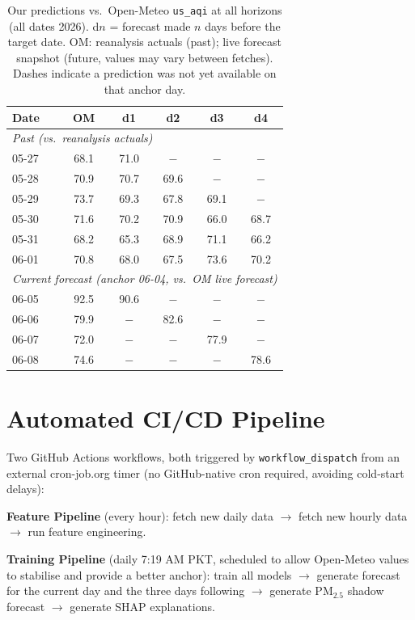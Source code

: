 \documentclass[11pt,a4paper]{article}
\begin{document}
\begin{table}[H]
\centering
\caption{Our predictions vs.\ Open-Meteo \texttt{us\_aqi} at all horizons (all dates 2026).
         d$n$ = forecast made $n$ days before the target date.
         OM: reanalysis actuals (past); live forecast snapshot (future, values may vary between fetches).
         Dashes indicate a prediction was not yet available on that anchor day.}
\footnotesize
\begin{tabular}{@{}lccccc@{}}
\toprule
\textbf{Date} & \textbf{OM} & \textbf{d1} & \textbf{d2} & \textbf{d3} & \textbf{d4} \\
\midrule
\multicolumn{6}{l}{\textit{Past (vs.\ reanalysis actuals)}} \\
05-27 & 68.1 & 71.0 & $-$ & $-$ & $-$ \\
05-28 & 70.9 & 70.7 & 69.6 & $-$ & $-$ \\
05-29 & 73.7 & 69.3 & 67.8 & 69.1 & $-$ \\
05-30 & 71.6 & 70.2 & 70.9 & 66.0 & 68.7 \\
05-31 & 68.2 & 65.3 & 68.9 & 71.1 & 66.2 \\
06-01 & 70.8 & 68.0 & 67.5 & 73.6 & 70.2 \\
\midrule
\multicolumn{6}{l}{\textit{Current forecast (anchor 06-04, vs.\ OM live forecast)}} \\
06-05 & 92.5 & 90.6 & $-$ & $-$ & $-$ \\
06-06 & 79.9 & $-$ & 82.6 & $-$ & $-$ \\
06-07 & 72.0 & $-$ & $-$ & 77.9 & $-$ \\
06-08 & 74.6 & $-$ & $-$ & $-$ & 78.6 \\
\bottomrule
\end{tabular}
\end{table}

\section{Automated CI/CD Pipeline}

Two GitHub Actions workflows, both triggered by \texttt{workflow\_dispatch} from
an external cron-job.org timer (no GitHub-native cron required, avoiding cold-start
delays):

\textbf{Feature Pipeline} (every hour): fetch new daily data $\to$ fetch new hourly
data $\to$ run feature engineering.

\textbf{Training Pipeline} (daily 7:19 AM PKT, scheduled to allow Open-Meteo
values to stabilise and provide a better anchor):
train all models $\to$ generate forecast for the current day and the three days
following $\to$ generate PM$_{2.5}$ shadow forecast $\to$ generate SHAP
explanations.
\end{document}
